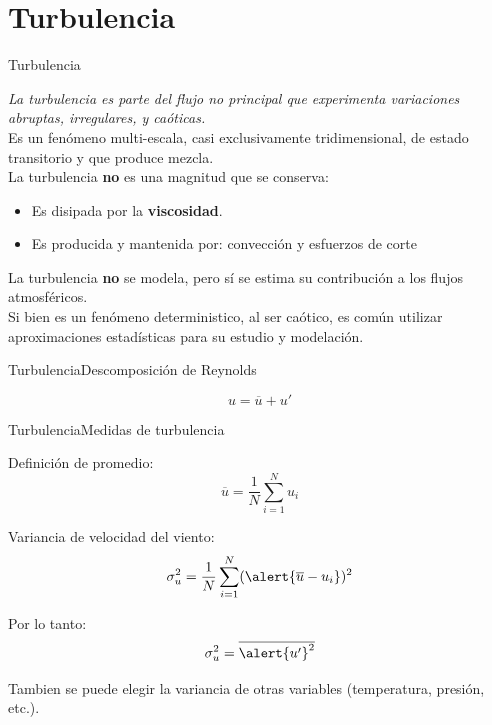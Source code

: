 \section{Turbulencia}
\begin{frame}{Turbulencia}
    
\textit{La turbulencia es parte del flujo no principal que experimenta variaciones abruptas, irregulares, y caóticas.}\\[0.5em]

 
Es un fenómeno multi-escala, casi exclusivamente tridimensional, de estado transitorio y que  produce \alert{mezcla}.\\[0.5em]

La turbulencia \textbf{no} es una magnitud que se conserva:
\begin{itemize}
    \item Es disipada por la \textbf{viscosidad}.
    \item Es producida y mantenida por: \alert{convección} y \alert{esfuerzos de corte}
\end{itemize}


La turbulencia \textbf{no} se modela, pero sí se estima su contribución a los flujos atmosféricos. \\[0.5em]

Si bien es un fenómeno deterministico, al ser caótico, es común utilizar aproximaciones \alert{estadísticas} para su estudio y modelación.

\end{frame}

\begin{frame}{Turbulencia}{Descomposición de Reynolds}

$$u = \overline{u}+u' $$

\begin{center}
\end{center}

\end{frame}   


\begin{frame}{Turbulencia}{Medidas de turbulencia}

Definición de promedio:
$$ \overline{u}=\frac{1}{N}\sum_{i=1}^{N} u_i $$

Variancia de velocidad del viento: 
$$ \sigma_u^2 = \frac{1}{N}\sum_{i=1}^N (\alert{\overline{u} - u_i} )^2$$

Por lo tanto:
$$ \sigma_u^2= \overline{\alert{u'}^2} $$

Tambien se puede elegir la variancia de otras variables (temperatura, presión, etc.).


\end{frame}


